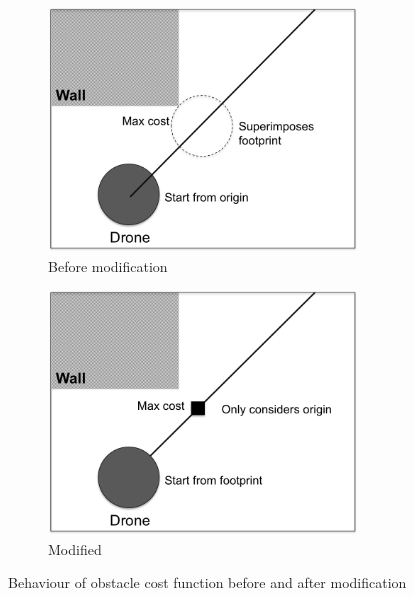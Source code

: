 \documentclass[capstone_report.tex]{subfiles}
\begin{document}
\begin{figure}[H]
    \centering
    \begin{subfigure}{0.5\textwidth}
        \centering
        \includegraphics[width=0.9\textwidth]{imgs/ocf_default.png}
        \caption{Before modification}
        \label{fig:ocf_default}
    \end{subfigure}%
    \begin{subfigure}{0.5\textwidth}
        \centering
        \includegraphics[width=0.9\textwidth]{imgs/ocf_mod.png}
        \caption{Modified}
        \label{fig:ocf_mod}
    \end{subfigure}
    \caption{Behaviour of obstacle cost function before and after modification}\label{fig:ocf_comp}
\end{figure}
\end{document}
